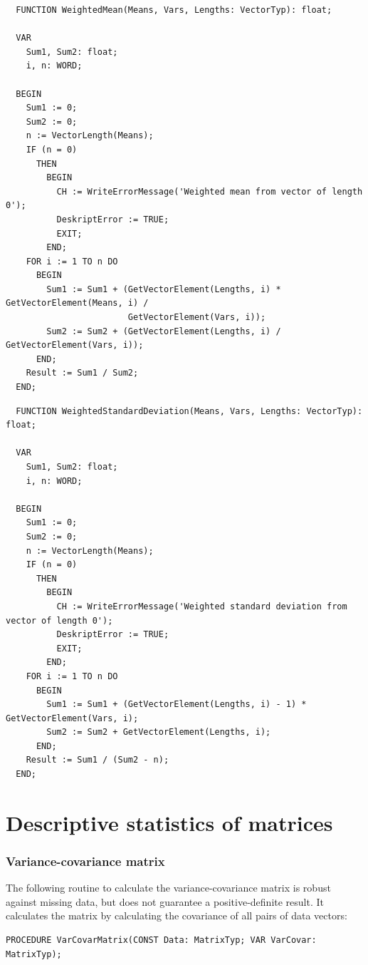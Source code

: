 \begin{refsection}
\begin{lstlisting}
  FUNCTION WeightedMean(Means, Vars, Lengths: VectorTyp): float;

  VAR
    Sum1, Sum2: float;
    i, n: WORD;

  BEGIN
    Sum1 := 0;
    Sum2 := 0;
    n := VectorLength(Means);
    IF (n = 0)
      THEN
        BEGIN
          CH := WriteErrorMessage('Weighted mean from vector of length 0');
          DeskriptError := TRUE;
          EXIT;
        END;
    FOR i := 1 TO n DO
      BEGIN
        Sum1 := Sum1 + (GetVectorElement(Lengths, i) * GetVectorElement(Means, i) /
                        GetVectorElement(Vars, i));
        Sum2 := Sum2 + (GetVectorElement(Lengths, i) / GetVectorElement(Vars, i));
      END;
    Result := Sum1 / Sum2;
  END;
\end{lstlisting}


\begin{lstlisting}
  FUNCTION WeightedStandardDeviation(Means, Vars, Lengths: VectorTyp): float;

  VAR
    Sum1, Sum2: float;
    i, n: WORD;

  BEGIN
    Sum1 := 0;
    Sum2 := 0;
    n := VectorLength(Means);
    IF (n = 0)
      THEN
        BEGIN
          CH := WriteErrorMessage('Weighted standard deviation from vector of length 0');
          DeskriptError := TRUE;
          EXIT;
        END;
    FOR i := 1 TO n DO
      BEGIN
        Sum1 := Sum1 + (GetVectorElement(Lengths, i) - 1) * GetVectorElement(Vars, i);
        Sum2 := Sum2 + GetVectorElement(Lengths, i);
      END;
    Result := Sum1 / (Sum2 - n);
  END;
\end{lstlisting}

\section{Descriptive statistics of matrices}

\subsubsection{Variance-covariance matrix}

The following routine to calculate the variance-covariance matrix  is robust against missing data, but does not guarantee a positive-definite result. It calculates the matrix by calculating the covariance of all pairs of data vectors:

\begin{lstlisting}[caption=Variance-covariance matrix]
  PROCEDURE VarCovarMatrix(CONST Data: MatrixTyp; VAR VarCovar: MatrixTyp);


\end{lstlisting}
\end{refsection}
